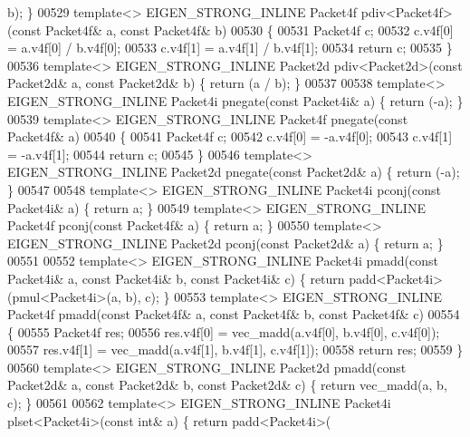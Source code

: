 \begin{DoxyCode}
{      b); \}
00529 \textcolor{keyword}{template}<> EIGEN\_STRONG\_INLINE Packet4f pdiv<Packet4f>(\textcolor{keyword}{const} Packet4f& a, \textcolor{keyword}{const} Packet4f& b)
00530 \{
00531   Packet4f c;
00532   c.v4f[0] = a.v4f[0] / b.v4f[0];
00533   c.v4f[1] = a.v4f[1] / b.v4f[1];
00534   \textcolor{keywordflow}{return} c;
00535 \}
00536 \textcolor{keyword}{template}<> EIGEN\_STRONG\_INLINE Packet2d pdiv<Packet2d>(\textcolor{keyword}{const} Packet2d& a, \textcolor{keyword}{const} Packet2d& b) \{ \textcolor{keywordflow}{return} (a / 
      b); \}
00537 
00538 \textcolor{keyword}{template}<> EIGEN\_STRONG\_INLINE Packet4i pnegate(\textcolor{keyword}{const} Packet4i& a) \{ \textcolor{keywordflow}{return} (-a); \}
00539 \textcolor{keyword}{template}<> EIGEN\_STRONG\_INLINE Packet4f pnegate(\textcolor{keyword}{const} Packet4f& a)
00540 \{
00541   Packet4f c;
00542   c.v4f[0] = -a.v4f[0];
00543   c.v4f[1] = -a.v4f[1];
00544   \textcolor{keywordflow}{return} c;
00545 \}
00546 \textcolor{keyword}{template}<> EIGEN\_STRONG\_INLINE Packet2d pnegate(\textcolor{keyword}{const} Packet2d& a) \{ \textcolor{keywordflow}{return} (-a); \}
00547 
00548 \textcolor{keyword}{template}<> EIGEN\_STRONG\_INLINE Packet4i pconj(\textcolor{keyword}{const} Packet4i& a) \{ \textcolor{keywordflow}{return} a; \}
00549 \textcolor{keyword}{template}<> EIGEN\_STRONG\_INLINE Packet4f pconj(\textcolor{keyword}{const} Packet4f& a) \{ \textcolor{keywordflow}{return} a; \}
00550 \textcolor{keyword}{template}<> EIGEN\_STRONG\_INLINE Packet2d pconj(\textcolor{keyword}{const} Packet2d& a) \{ \textcolor{keywordflow}{return} a; \}
00551 
00552 \textcolor{keyword}{template}<> EIGEN\_STRONG\_INLINE Packet4i pmadd(\textcolor{keyword}{const} Packet4i& a, \textcolor{keyword}{const} Packet4i& b, \textcolor{keyword}{const} Packet4i& c) \{ \textcolor{keywordflow}{
      return} padd<Packet4i>(pmul<Packet4i>(a, b), c); \}
00553 \textcolor{keyword}{template}<> EIGEN\_STRONG\_INLINE Packet4f pmadd(\textcolor{keyword}{const} Packet4f& a, \textcolor{keyword}{const} Packet4f& b, \textcolor{keyword}{const} Packet4f& c)
00554 \{
00555   Packet4f res;
00556   res.v4f[0] = vec\_madd(a.v4f[0], b.v4f[0], c.v4f[0]);
00557   res.v4f[1] = vec\_madd(a.v4f[1], b.v4f[1], c.v4f[1]);
00558   \textcolor{keywordflow}{return} res;
00559 \}
00560 \textcolor{keyword}{template}<> EIGEN\_STRONG\_INLINE Packet2d pmadd(\textcolor{keyword}{const} Packet2d& a, \textcolor{keyword}{const} Packet2d& b, \textcolor{keyword}{const} Packet2d& c) \{ \textcolor{keywordflow}{
      return} vec\_madd(a, b, c); \}
00561 
00562 \textcolor{keyword}{template}<> EIGEN\_STRONG\_INLINE Packet4i plset<Packet4i>(\textcolor{keyword}{const} \textcolor{keywordtype}{int}& a)    \{ \textcolor{keywordflow}{return} padd<Packet4i>(
}
\end{DoxyCode}
